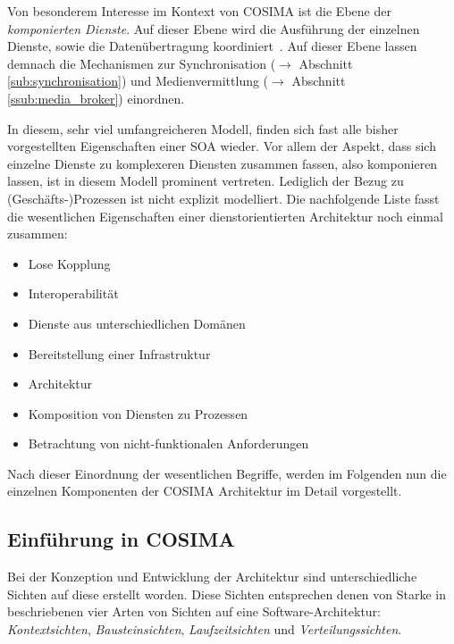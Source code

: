   Von besonderem Interesse im Kontext von COSIMA ist die Ebene der \emph{komponierten Dienste}. Auf dieser Ebene wird die Ausführung der einzelnen Dienste, sowie die Datenübertragung koordiniert~\cite[S. 8]{service_oriented_computing}. Auf dieser Ebene lassen demnach die Mechanismen zur Synchronisation ($\to$ Abschnitt \ref{sub:synchronisation}) und Medienvermittlung ($\to$ Abschnitt \ref{ssub:media_broker}) einordnen.
  
  In diesem, sehr viel umfangreicheren Modell, finden sich fast alle bisher vorgestellten Eigenschaften einer SOA wieder. Vor allem der Aspekt, dass sich einzelne Dienste zu komplexeren Diensten zusammen fassen, also komponieren lassen, ist in diesem Modell prominent vertreten. Lediglich der Bezug zu (Geschäfts-)Prozessen ist nicht explizit modelliert. Die nachfolgende Liste fasst die wesentlichen Eigenschaften einer dienstorientierten Architektur noch einmal zusammen:

  \begin{itemize}
    \item Lose Kopplung
    \item Interoperabilität
    \item Dienste aus unterschiedlichen Domänen
    \item Bereitstellung einer Infrastruktur
    \item Architektur
    \item Komposition von Diensten zu Prozessen
    \item Betrachtung von nicht-funktionalen Anforderungen
  \end{itemize}


  Nach dieser Einordnung der wesentlichen Begriffe, werden im Folgenden nun die einzelnen Komponenten der COSIMA Architektur im Detail vorgestellt.


\subsection{Einführung in COSIMA} %
\label{sub:einfuehrung}

  Bei der Konzeption und Entwicklung der Architektur sind unterschiedliche Sichten auf diese erstellt worden. Diese Sichten entsprechen denen von Starke in~\citep[S. 83]{effektive_software_architekturen} beschriebenen vier Arten von Sichten auf eine Software-Architektur: \emph{Kontextsichten}, \emph{Bausteinsichten}, \emph{Laufzeitsichten} und \emph{Verteilungssichten}.

